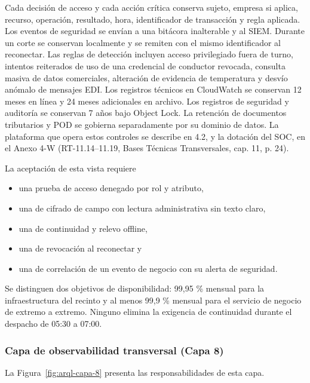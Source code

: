 Cada decisión de acceso y cada acción crítica conserva sujeto, empresa si aplica, recurso, operación, resultado, hora, identificador de transacción y regla aplicada. Los eventos de seguridad se envían a una bitácora inalterable y al SIEM. Durante un corte se conservan localmente y se remiten con el mismo identificador al reconectar. Las reglas de detección incluyen acceso privilegiado fuera de turno, intentos reiterados de uso de una credencial de conductor revocada, consulta masiva de datos comerciales, alteración de evidencia de temperatura y desvío anómalo de mensajes EDI. Los registros técnicos en CloudWatch se conservan 12 meses en línea y 24 meses adicionales en archivo. Los registros de seguridad y auditoría se conservan 7 años bajo Object Lock. La retención de documentos tributarios y POD se gobierna separadamente por su dominio de datos. La plataforma que opera estos controles se describe en 4.2, y la dotación del SOC, en el Anexo 4-W (RT-11.14--11.19, Bases Técnicas Transversales, cap. 11, p. 24).

La aceptación de esta vista requiere

\begin{itemize}
  \item una prueba de acceso denegado por rol y atributo,
  \item una de cifrado de campo con lectura administrativa sin texto claro,
  \item una de continuidad y relevo offline,
  \item una de revocación al reconectar y
  \item una de correlación de un evento de negocio con su alerta de seguridad.
\end{itemize}

Se distinguen dos objetivos de disponibilidad: 99,95 \% mensual para la infraestructura del recinto y al menos 99,9 \% mensual para el servicio de negocio de extremo a extremo. Ninguno elimina la exigencia de continuidad durante el despacho de 05:30 a 07:00.


\subsubsection{Capa de observabilidad transversal (Capa 8)}

La Figura~\ref{fig:arql-capa-8} presenta las responsabilidades de esta capa.


